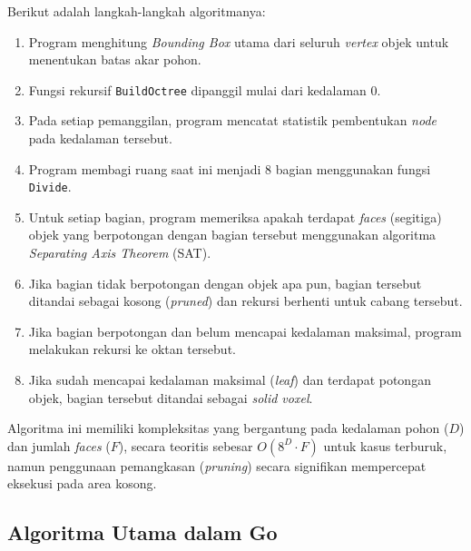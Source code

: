 Berikut adalah langkah-langkah algoritmanya:
\begin{enumerate}
    \item Program menghitung \textit{Bounding Box} utama dari seluruh \textit{vertex} objek untuk menentukan batas akar pohon.
    \item Fungsi rekursif \texttt{BuildOctree} dipanggil mulai dari kedalaman 0.
    \item Pada setiap pemanggilan, program mencatat statistik pembentukan \textit{node} pada kedalaman tersebut.
    \item Program membagi ruang saat ini menjadi 8 bagian menggunakan fungsi \texttt{Divide}.
    \item Untuk setiap bagian, program memeriksa apakah terdapat \textit{faces} (segitiga) objek yang berpotongan dengan bagian tersebut menggunakan algoritma \textit{Separating Axis Theorem} (SAT).
    \item Jika bagian tidak berpotongan dengan objek apa pun, bagian tersebut ditandai sebagai kosong (\textit{pruned}) dan rekursi berhenti untuk cabang tersebut.
    \item Jika bagian berpotongan dan belum mencapai kedalaman maksimal, program melakukan rekursi ke oktan tersebut.
    \item Jika sudah mencapai kedalaman maksimal (\textit{leaf}) dan terdapat potongan objek, bagian tersebut ditandai sebagai \textit{solid voxel}.
\end{enumerate}

Algoritma ini memiliki kompleksitas yang bergantung pada kedalaman pohon ($D$) dan jumlah \textit{faces} ($F$), secara teoritis sebesar $O(8^D \cdot F)$ untuk kasus terburuk, namun penggunaan pemangkasan (\textit{pruning}) secara signifikan mempercepat eksekusi pada area kosong.

\subsection{Algoritma Utama dalam Go}\label{sub:Algoritma Utama dalam Go} %

